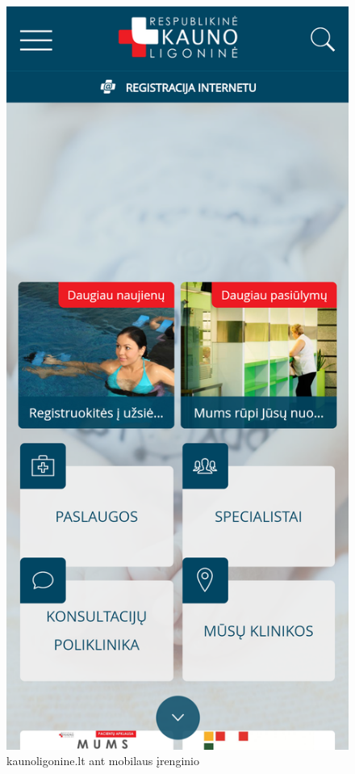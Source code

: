 \documentclass{VUMIFPSkursinis}
\begin{document}
\begin{figure}[H]
    \centering
    \begin{minipage}{.5\textwidth}
    \centering
    \includegraphics[scale=0.12]{img/KaunoMobile}
    \caption{kaunoligonine.lt ant mobilaus įrenginio}

\end{minipage}
\end{figure}
\end{document}
